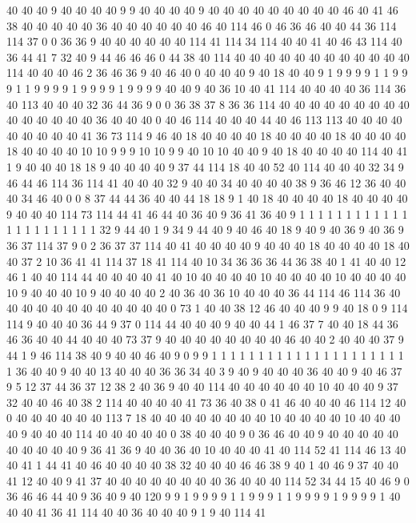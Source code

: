 40 40 40 9 40 40 40 40 9 9 40 40 40 40 9 40 40 40 40 40
40 40 40 40 46 40 41 46 38 40 40 40 40 40 36 40 40 40 40 40
40 46 40 114 46 0 46 36 46 40 40 44 36 114 114 37 0 0 36 36
9 40 40 40 40 40 40 114 41 114 34 114 40 40 41 40 46 43 114 40
36 44 41 7 32 40 9 44 46 46 46 0 44 38 40 114 40 40 40 40
40 40 40 40 40 40 40 40 114 40 40 40 46 2 36 46 36 9 40 46
40 0 40 40 40 9 40 18 40 40 9 1 9 9 9 9 1 1 9 9
9 1 1 9 9 9 9 1 9 9 9 9 1 9 9 9 9 40 40 9
40 36 10 40 41 114 40 40 40 40 36 114 36 40 113 40 40 40 32 36
44 36 9 0 0 36 38 37 8 36 36 114 40 40 40 40 40 40 40 40
40 40 40 40 40 40 40 36 40 40 40 0 40 46 114 40 40 40 44 40
46 113 113 40 40 40 40 40 40 40 40 40 41 36 73 114 9 46 40 18
40 40 40 40 18 40 40 40 40 18 40 40 40 40 18 40 40 40 40 10
10 9 9 9 10 10 9 9 40 10 10 40 40 9 40 18 40 40 40 40
114 40 41 1 9 40 40 40 18 18 9 40 40 40 40 9 37 44 114 18
40 40 52 40 114 40 40 40 32 34 9 46 44 46 114 36 114 41 40 40
40 32 9 40 40 34 40 40 40 40 38 9 36 46 12 36 40 40 40 34
46 40 0 0 8 37 44 44 36 40 40 44 18 18 9 1 40 18 40 40
40 40 18 40 40 40 40 9 40 40 40 114 73 114 44 41 46 44 40 36
40 9 36 41 36 40 9 1 1 1 1 1 1 1 1 1 1 1 1 1
1 1 1 1 1 1 1 1 1 32 9 44 40 1 9 34 9 44 40 9
40 46 40 18 9 40 9 40 36 9 40 36 9 36 37 114 37 9 0 2
36 37 37 114 40 41 40 40 40 40 9 40 40 40 18 40 40 40 40 18
40 40 37 2 10 36 41 41 114 37 18 41 114 40 10 34 36 36 36 44
36 38 40 1 41 40 40 12 46 1 40 40 114 44 40 40 40 40 41 40
10 40 40 40 40 10 40 40 40 40 10 40 40 40 40 10 9 40 40 40
10 9 40 40 40 40 2 40 36 40 36 10 40 40 40 36 44 114 46 114
36 40 40 40 40 40 40 40 40 40 40 40 40 0 73 1 40 40 38 12
46 40 40 40 9 9 40 18 0 9 114 114 9 40 40 40 36 44 9 37
0 114 44 40 40 40 9 40 40 44 1 46 37 7 40 40 18 44 36 46
36 40 40 44 40 40 40 73 37 9 40 40 40 40 40 40 40 40 46 40
40 2 40 40 40 37 9 44 1 9 46 114 38 40 9 40 40 46 40 9
0 9 9 1 1 1 1 1 1 1 1 1 1 1 1 1 1 1 1 1
1 1 1 1 1 36 40 40 9 40 40 13 40 40 40 36 36 34 40 3
9 40 9 40 40 40 36 40 40 9 40 46 37 9 5 12 37 44 36 37
12 38 2 40 36 9 40 40 114 40 40 40 40 40 40 10 40 40 40 9
37 32 40 40 46 40 38 2 114 40 40 40 40 41 73 36 40 38 0 41
46 40 40 40 46 114 12 40 0 40 40 40 40 40 40 113 7 18 40 40
40 40 40 40 40 40 10 40 40 40 40 10 40 40 40 40 9 40 40 40
114 40 40 40 40 40 0 38 40 40 40 9 0 36 46 40 40 9 40 40
40 40 40 40 40 40 40 40 9 36 41 36 9 40 40 36 40 10 40 40
40 41 40 114 52 41 114 46 13 40 40 41 1 44 41 40 46 40 40 40
40 38 32 40 40 40 46 46 38 9 40 1 40 46 9 37 40 40 41 12
40 40 9 41 37 40 40 40 40 40 40 40 40 36 40 40 40 114 52 34
44 15 40 46 9 0 36 46 46 44 40 9 36 40 9 40 120 9 9 1
9 9 9 9 1 1 9 9 9 1 1 9 9 9 9 1 9 9 9 9
1 40 40 40 41 36 41 114 40 40 36 40 40 40 9 1 9 40 114 41
